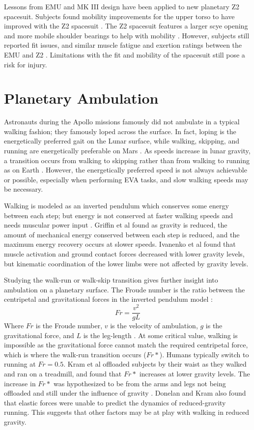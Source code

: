 \documentclass[defaultstyle,11pt]{comps}
\begin{document}
Lessons from EMU and MK III design have been applied to new planetary Z2 spacesuit. Subjects found mobility improvements for the upper torso to have improved with the Z2 spacesuit \citep{Meginnis2018}.
The Z2 spacesuit features a larger scye opening and more mobile shoulder bearings to help with mobility \citep{Graziosi2016}.
However, subjects still reported fit issues, and similar muscle fatigue and exertion ratings between the EMU and Z2 \citep{Meginnis2018}.
Limitations with the fit and mobility of the spacesuit still pose a risk for injury.

\hypertarget{planetary-ambulation}{%
\section{Planetary Ambulation}\label{planetary-ambulation}}

Astronauts during the Apollo missions famously did not ambulate in a typical walking fashion; they famously loped across the surface.
In fact, loping is the energetically preferred gait on the Lunar surface, while walking, skipping, and running are energetically preferable on Mars \citep{Ackermann2012b}.
As speeds increase in lunar gravity, a transition occurs from walking to skipping rather than from walking to running as on Earth \citep{Minetti2012}.
However, the energetically preferred speed is not always achievable or possible, especially when performing EVA tasks, and slow walking speeds may be necessary.

Walking is modeled as an inverted pendulum which conserves some energy between each step; but energy is not conserved at faster walking speeds and needs muscular power input \citep{Cavagna1976, Cavagna1977}.
Griffin et al \citep{Griffin1999} found as gravity is reduced, the amount of mechanical energy conserved between each step is reduced, and the maximum energy recovery occurs at slower speeds.
Ivanenko et al \citep{Ivanenko2002} found that muscle activation and ground contact forces decreased with lower gravity levels, but kinematic coordination of the lower limbs were not affected by gravity levels.

Studying the walk-run or walk-skip transition gives further insight into ambulation on a planetary surface.
The Froude number is the ratio between the centripetal and gravitational forces in the inverted pendulum model :
\[
Fr=\frac{v^{2}}{gL}
\]
Where \(Fr\) is the Froude number, \(v\) is the velocity of ambulation, \(g\) is the gravitational force, and \(L\) is the leg-length \citep{Alexander1989}.
At some critical value, walking is impossible as the gravitational force cannot match the required centripetal force, which is where the walk-run transition occurs (\(Fr*\)).
Humans typically switch to running at \(Fr=0.5\).
Kram et al \citep{Kram1997} offloaded subjects by their waist as they walked and ran on a treadmill, and found that \(Fr*\) increases at lower gravity levels.
The increase in \(Fr*\) was hypothesized to be from the arms and legs not being offloaded and still under the influence of gravity \citep{Kram1997}.
Donelan and Kram \citep{Donelan2000} also found that elastic forces were unable to predict the dynamics of reduced-gravity running.
This suggests that other factors may be at play with walking in reduced gravity.
\end{document}
